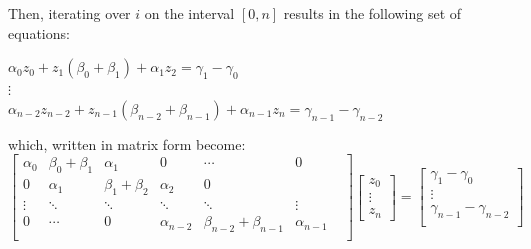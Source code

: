 \documentclass{article}
\begin{document}
  Then, iterating over $i$ on the interval $[0,n]$ results in the following set of equations:

  \begin{center}
    $\alpha_{0}z_{0} + z_1(\beta_{0} + \beta_1) + \alpha_1 z_{2} = \gamma_1
    - \gamma_{0}$ \\
    $\vdots$ \\
    $\alpha_{n-2}z_{n-2} + z_{n-1}(\beta_{n-2} + \beta_{n-1}) + \alpha_{n-1}
    z_{n} = \gamma_{n-1} - \gamma_{n-2}$ \\
  \end{center}

  which, written in matrix form become: \\

  $
  \begin{bmatrix}
    \alpha_0 & \beta_0 + \beta_1 & \alpha_1 & 0 & \cdots & 0 \\
    0 & \alpha_1 & \beta_1 + \beta_2 & \alpha_2 & 0 & \\
    \vdots & \ddots & \ddots & \ddots & \ddots &\vdots \\
    0 &  \cdots & 0 & \alpha_{n-2} & \beta_{n-2} + \beta_{n-1} & \alpha_{n-1} & \\
  \end{bmatrix}
  \begin{bmatrix}
    z_0 \\
    \vdots \\
    z_n
  \end{bmatrix}
  =
  \begin{bmatrix}
   \gamma_1 - \gamma_0\\
    \vdots \\
    \gamma_{n-1} - \gamma_{n-2}\\
  \end{bmatrix}
  $ \\
\end{document}
